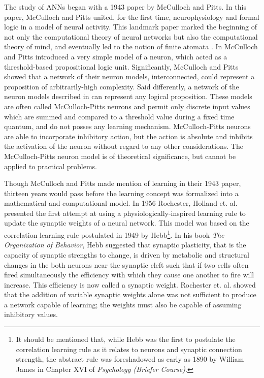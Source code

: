 \documentclass[11pt]{afthesis}
\begin{document}
	
	The study of ANNs began with a 1943 paper \cite{mcculloch1988} by McCulloch and Pitts. In this paper, McCulloch and Pitts united, for the first time, neurophysiology and formal logic in a model of neural activity. This landmark paper marked the beginning of not only the computational theory of neural networks but also the computational theory of mind, and eventually led to the notion of finite atomata \cite{piccinini2006}. In  \cite{mcculloch1988} McCulloch and Pitts introduced a very simple model of a neuron, which acted as a threshold-based propositional logic unit. Significantly, McCulloch and Pitts showed that a network of their neuron models, interconnected, could represent a proposition of arbitrarily-high complexity. Said differently, a network of the neuron models described in  \cite{mcculloch1988} can represent any logical proposition. These models are often called McCulloch-Pitts neurons and permit only discrete input values which are summed and compared to a threshold value during a fixed time quantum, and do not posses any learning mechanism.  McCulloch-Pitts neurons are able to incorporate inhibitory action, but the action is absolute and inhibits the activation of the neuron without regard to any other considerations. The McCulloch-Pitts neuron model is of theoretical significance, but cannot be applied to practical problems.
	
	
	Though McCulloch and Pitts made mention of learning in their 1943 paper, thirteen years would pass before the learning concept was formalized into a mathematical and computational model. In 1956 Rochester, Holland et. al. \cite{rochester1956} presented the first attempt at using a physiologically-inspired learning rule to update the synaptic weights of a neural network. This model was based on the correlation learning rule postulated in 1949 by Hebb\footnote{It should be mentioned that, while Hebb was the first to postulate the correlation learning rule as it relates to neurons and synaptic connection strength, the abstract rule was foreshadowed as early as 1890 by William James \cite{james1890principles} in Chapter XVI of \textit{Psychology (Briefer Course)}.}. In his book \textit{The Organization of Behavior}, Hebb suggested that synaptic plasticity, that is the capacity of synaptic strengths to change, is driven by metabolic and structural changes in the both neurons near the synaptic cleft \cite{hebb1967} such that if two cells often fired simultaneously the efficiency with which they cause one another to fire will increase. This efficiency is now called a synaptic weight. Rochester et. al. showed that the addition of variable synaptic weights alone was not sufficient to produce a network capable of learning; the weights must also be capable of assuming inhibitory values.
	
\end{document}

